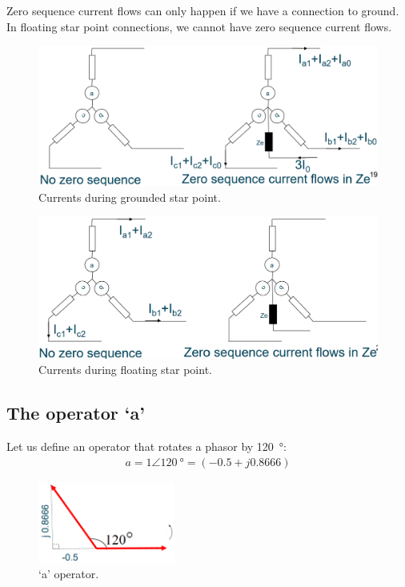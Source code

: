 \documentclass[class=report, crop=false, 12pt,a4paper]{standalone}
\begin{document}
Zero sequence current flows can only happen if we have a connection to ground. In floating star point connections, we cannot have zero sequence current flows.
\begin{figure}[H]
	\centering
	\includegraphics[width = \textwidth]{../img/figure25.png}
	\caption{Currents during grounded star point.}
\end{figure}
\begin{figure}[H]
	\centering
	\includegraphics[width = \textwidth]{../img/figure26.png}
	\caption{Currents during floating star point.}
\end{figure}
\subsection{The operator `a'}
Let us define an operator that rotates a phasor by \SI{120}{\degree}:
\begin{gather}
	a = 1\angle \SI{120}{\degree} = (-0.5 + j 0.8666)
\end{gather}
\begin{figure}[H]
	\centering
	\includegraphics[width = 0.4\textwidth]{../img/figure27.png}
	\caption{`a' operator.}
\end{figure}
\end{document}
